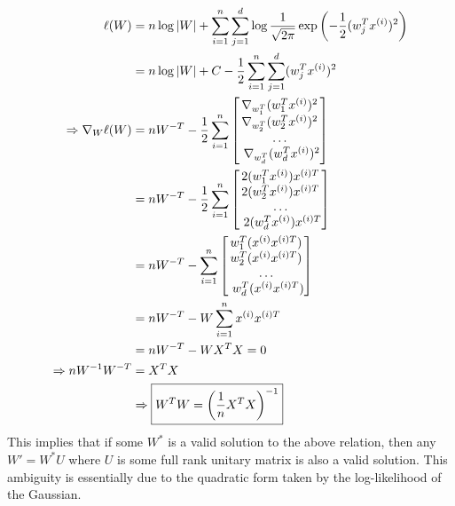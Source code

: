 \begin{answer}
\def\xsi{x^{(i)}}
\begin{align*}
    \ell(W) &= \nexp\log|W| + \sum_{i=1}^\nexp\sum_{j=1}^\di \log \frac{1}{\sqrt{2\pi}}\exp\left(-\frac{1}{2}(w_j^T\xsi)^2\right) \\
    &= \nexp\log|W| +C -\frac{1}{2}\sum_{i=1}^\nexp\sum_{j=1}^\di (w_j^T\xsi)^2 \\
    \Rightarrow \nabla_W \ell(W) &= \nexp W^{-T} -\frac{1}{2}\sum_{i=1}^\nexp \begin{bmatrix}\nabla_{w_1^T}  (w_1^T\xsi)^2 \\\nabla_{w_2^T} (w_2^T\xsi)^2 \\ \ldots \\\ \nabla_{w_{\di}^T} (w_{\di}^T\xsi)^2 \end{bmatrix}\\
    &= \nexp W^{-T} -\frac{1}{2}\sum_{i=1}^\nexp \begin{bmatrix} 2 (w_1^T\xsi) x^{(i)T} \\ 2 (w_2^T\xsi) x^{(i)T} \\ \ldots \\\ 2 (w_{\di}^T\xsi) x^{(i)T} \end{bmatrix}\\
    &= \nexp W^{-T} - \sum_{i=1}^\nexp \begin{bmatrix}  w_1^T(\xsi x^{(i)T}) \\  w_2^T(\xsi x^{(i)T}) \\ \ldots \\\  w_{\di}^T(\xsi x^{(i)T}) \end{bmatrix}\\
    &= \nexp W^{-T} - W \sum_{i=1}^\nexp \xsi x^{(i)T} \\
    &= \nexp W^{-T} - WX^TX = 0 \\
    \Rightarrow \nexp W^{-1}W^{-T} &= X^TX \\
    &\Rightarrow \boxed{W^TW = \left(\frac{1}{\nexp}X^TX\right)^{-1}}
\end{align*}
This implies that if some $W^*$ is a valid solution to the above relation, then any $W' = W^*U$ where $U$ is some full rank unitary matrix is also a valid solution. This ambiguity is essentially due to the quadratic form taken by the log-likelihood of the Gaussian.
\end{answer}
